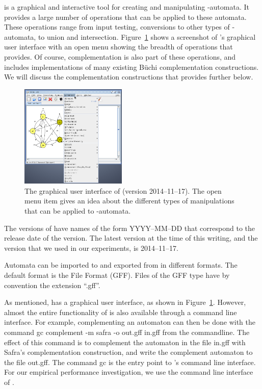 \goal{} is a graphical and interactive tool for creating and manipulating \om-automata. It provides a large number of operations that can be applied to these automata. These operations range from input testing, conversions to other types of \om-automata, to union and intersection. Figure~\ref{goal_gui} shows a screenshot of \goal's graphical user interface with an open menu showing the breadth of operations that \goal{} provides. Of course, complementation is also part of these operations, and \goal{} includes implementations of many existing Büchi complementation constructions. We will discuss the complementation constructions that \goal{} provides further below.

\begin{figure}[htb!]
\centering
\includegraphics[width=0.45\textwidth]{figures/goal.png}
\caption{The graphical user interface of \goal{} (version 2014--11--17). The open menu item gives an idea about the different types of manipulations that can be applied to \om-automata.}
\label{goal_gui}
\end{figure}

The versions of \goal{} have names of the form YYYY--MM--DD that correspond to the release date of the version. The latest version at the time of this writing, and the version that we used in our experiments, is 2014--11--17.

Automata can be imported to and exported from \goal{} in different formats. The default format is the \goal{} File Format (GFF). Files of the GFF type have by convention the extension ``.gff''. 

As mentioned, \goal{} has a graphical user interface, as shown in Figure~\ref{goal_gui}. However, almost the entire functionality of \goal{} is also available through a command line interface. For example, complementing an automaton can then be done with the command \textsf{gc complement -m safra -o out.gff in.gff} from the commandline. The effect of this command is to complement the automaton in the file \textsf{in.gff} with Safra's complementation construction, and write the complement automaton to the file \textsf{out.gff}. The command \textsf{gc} is the entry point to \goal's command line interface. For our empirical performance investigation, we use the command line interface of \goal.

